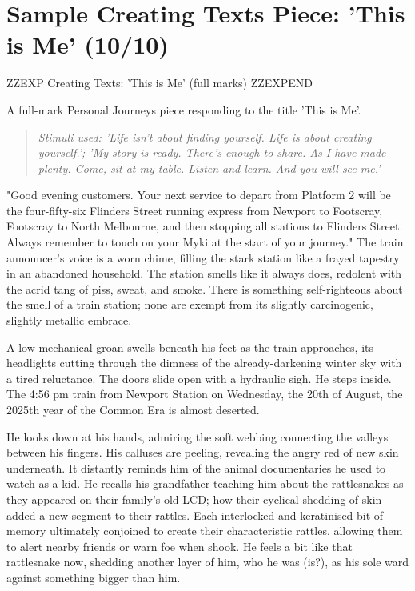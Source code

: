 \documentclass[a4paper]{article}
\begin{document}
\newpage

\section{Sample Creating Texts Piece: 'This is Me' (10/10)}


ZZEXP Creating Texts: 'This is Me' (full marks) ZZEXPEND


A full-mark Personal Journeys piece responding to the title 'This is Me'.
\begin{quote}
\textit{Stimuli used: 'Life isn't about finding yourself. Life is about creating yourself.'; 'My story is ready. There's enough to share. As I have made plenty. Come, sit at my table. Listen and learn. And you will see me.'}
\end{quote}

"Good evening customers. Your next service to depart from Platform 2 will be the four-fifty-six Flinders Street running express from Newport to Footscray, Footscray to North Melbourne, and then stopping all stations to Flinders Street. Always remember to touch on your Myki at the start of your journey." The train announcer's voice is a worn chime, filling the stark station like a frayed tapestry in an abandoned household. The station smells like it always does, redolent with the acrid tang of piss, sweat, and smoke. There is something self-righteous about the smell of a train station; none are exempt from its slightly carcinogenic, slightly metallic embrace.

A low mechanical groan swells beneath his feet as the train approaches, its headlights cutting through the dimness of the already-darkening winter sky with a tired reluctance. The doors slide open with a hydraulic sigh. He steps inside. The 4:56 pm train from Newport Station on Wednesday, the 20th of August, the 2025th year of the Common Era is almost deserted.

He looks down at his hands, admiring the soft webbing connecting the valleys between his fingers. His calluses are peeling, revealing the angry red of new skin underneath. It distantly reminds him of the animal documentaries he used to watch as a kid. He recalls his grandfather teaching him about the rattlesnakes as they appeared on their family's old LCD; how their cyclical shedding of skin added a new segment to their rattles. Each interlocked and keratinised bit of memory ultimately conjoined to create their characteristic rattles, allowing them to alert nearby friends or warn foe when shook. He feels a bit like that rattlesnake now, shedding another layer of him, who he was (is?), as his sole ward against something bigger than him.
\end{document}
